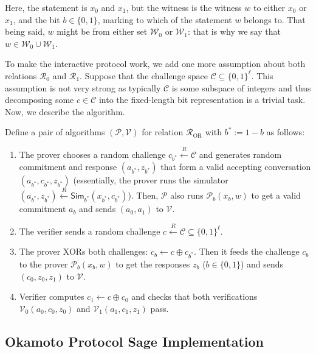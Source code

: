 \documentclass[../lecture-notes-148x210.tex]{subfiles}
\begin{document}
Here, the statement is $x_0$ and $x_1$, but the witness is the witness $w$ to either $x_0$ or $x_1$, and the bit $b \in \{0,1\}$, marking to which of the statement $w$ belongs to. That being said, $w$ might be from either set $\mathcal{W}_0$ or $\mathcal{W}_1$: that is why we say that $w \in \mathcal{W}_0 \cup \mathcal{W}_1$.

To make the interactive protocol work, we add one more assumption about both relations $\mathcal{R}_0$ and $\mathcal{R}_1$. Suppose that the challenge space $\mathcal{C} \subseteq \{0,1\}^{\ell}$. This assumption is not very strong as typically $\mathcal{C}$ is some subspace of integers and thus decomposing some $c \in \mathcal{C}$ into the fixed-length bit representation is a trivial task.
Now, we describe the algorithm.

\vspace{-2mm}

\begin{definition}
    Define a pair of algorithms $(\mathcal{P},\mathcal{V})$ for relation $\mathcal{R}_{\text{OR}}$ with $b^* := 1-b$ as follows:
    \begin{enumerate}
        \item The prover chooses a random challenge $c_{b^*} \xleftarrow{R} \mathcal{C}$ and generates random commitment and response $(a_{b^*}, z_{b^*})$ that form a valid accepting conversation $(a_{b^*}, c_{b^*}, z_{b^*})$ (essentially, the prover runs the simulator $(a_{b^*}, z_{b^*}) \xleftarrow{R} \mathsf{Sim}_{b^*}(x_{b^*}, c_{b^*})$). Then, $\mathcal{P}$ also runs $\mathcal{P}_b(x_b, w)$ to get a valid commitment $a_b$ and sends $(a_0,a_1)$ to $\mathcal{V}$.
        \item The verifier sends a random challenge $c \xleftarrow{R} \mathcal{C} \subseteq \{0,1\}^{\ell}$.
        \item The prover XORs both challenges: $c_b \gets c \oplus c_{b^*}$. Then it feeds the challenge $c_b$ to the prover $\mathcal{P}_b(x_b,w)$ to get the responses $z_b$ ($b \in \{0,1\}$) and sends $(c_0,z_0,z_1)$ to $\mathcal{V}$.
        \item Verifier computes $c_1 \gets c \oplus c_0$ and checks that both verifications $\mathcal{V}_0(a_0,c_0,z_0)$ and $\mathcal{V}_1(a_1,c_1,z_1)$ pass.
    \end{enumerate}
\end{definition}

\subsection{Okamoto Protocol Sage Implementation}
\end{document}
